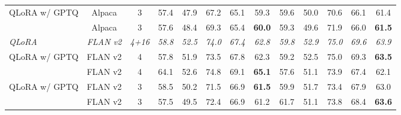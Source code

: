 \begin{table*}[!t]
{{\begin{tabular}{lcc:ccccc:ccccc}
  QLoRA w/ GPTQ & Alpaca & 3  & 57.4 & 47.9 & 67.2 & 65.1 & 59.3 & 59.6 & 50.0 & 70.6 & 66.1 & 61.4 \\
  \ours{}      & Alpaca & 3  & 57.6 & 48.4 & 69.3 & 65.4 & \textbf{60.0} & 59.3 & 49.6 & 71.9 & 66.0 & \textbf{61.5} \\
\noalign{\vspace{0.1em}}\hdashline[0.8pt/1pt]\noalign{\vspace{0.1em}}
  \textit{QLoRA} & \textit{FLAN v2} & \textit{4+16} & \textit{58.8} & \textit{52.5} & \textit{74.0} & \textit{67.4} & \textit{62.8} & \textit{59.8} & \textit{52.9} & \textit{75.0} & \textit{69.6} & \textit{63.9} \\
\noalign{\vspace{0.1em}}\hdashline[0.8pt/1pt]\noalign{\vspace{0.1em}}
  QLoRA w/ GPTQ & FLAN v2 & 4  & 57.8 & 51.9 & 73.5 & 67.8 & 62.3 & 59.2 & 52.5 & 75.0 & 69.3 & \textbf{63.5} \\
  \ours{}      & FLAN v2 & 4  & 64.1 & 52.6 & 74.8 & 69.1 & \textbf{65.1} & 57.6 & 51.1 & 73.9 & 67.4 & 62.1 \\
  QLoRA w/ GPTQ & FLAN v2 & 3  & 58.5 & 50.2 & 71.5 & 66.9 & \textbf{61.5} & 59.9 & 51.7 & 73.4 & 67.9 & 63.0 \\
  \ours{}      & FLAN v2 & 3  & 57.5 & 49.5 & 72.4 & 66.9 & 61.2 & 61.7 & 51.1 & 73.8 & 68.4 & \textbf{63.6} \\
\bottomrule
\end{tabular}}}
\vspace{-1em}
\end{table*}
